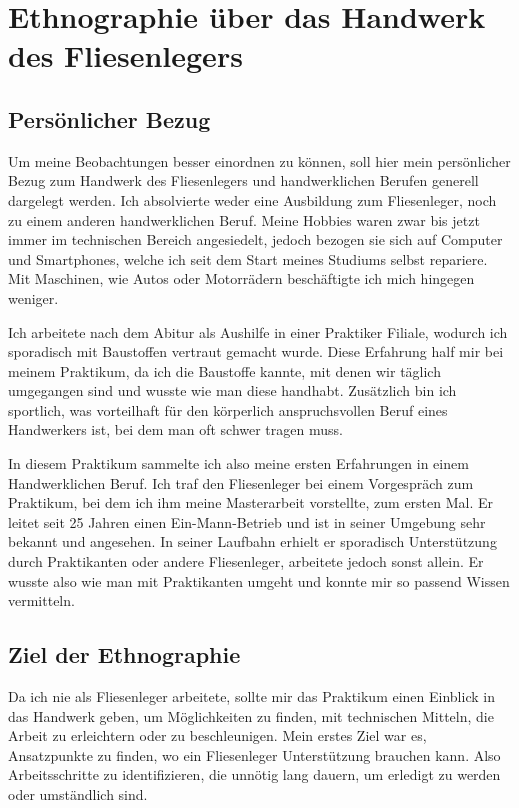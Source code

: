\chapter{Ethnographie über das Handwerk des Fliesenlegers}

\section{Persönlicher Bezug}

Um meine Beobachtungen besser einordnen zu können, soll hier mein persönlicher Bezug zum Handwerk des Fliesenlegers und handwerklichen Berufen generell dargelegt werden. Ich absolvierte weder eine Ausbildung zum Fliesenleger, noch zu einem anderen handwerklichen Beruf. Meine Hobbies waren zwar bis jetzt immer im technischen Bereich angesiedelt, jedoch bezogen sie sich auf Computer und Smartphones, welche ich seit dem Start meines Studiums selbst repariere. Mit Maschinen, wie Autos oder Motorrädern beschäftigte ich mich hingegen weniger. 

Ich arbeitete nach dem Abitur als Aushilfe in einer Praktiker Filiale, wodurch ich sporadisch mit Baustoffen vertraut gemacht wurde. Diese Erfahrung half mir bei meinem Praktikum, da ich die Baustoffe kannte, mit denen wir täglich umgegangen sind und wusste wie man diese handhabt. Zusätzlich bin ich sportlich, was vorteilhaft für den körperlich anspruchsvollen Beruf eines Handwerkers ist, bei dem man oft schwer tragen muss.

In diesem Praktikum sammelte ich also meine ersten Erfahrungen in einem Handwerklichen Beruf. Ich traf den Fliesenleger bei einem Vorgespräch zum Praktikum, bei dem ich ihm meine Masterarbeit vorstellte, zum ersten Mal. Er leitet seit 25 Jahren einen Ein-Mann-Betrieb und ist in seiner Umgebung sehr bekannt und angesehen. In seiner Laufbahn erhielt er sporadisch Unterstützung durch Praktikanten oder andere Fliesenleger, arbeitete jedoch sonst allein. Er wusste also wie man mit Praktikanten umgeht und konnte mir so passend Wissen vermitteln.

\section{Ziel der Ethnographie}

Da ich nie als Fliesenleger arbeitete, sollte mir das Praktikum einen Einblick in das Handwerk geben, um Möglichkeiten zu finden, mit technischen Mitteln, die Arbeit zu erleichtern oder zu beschleunigen. Mein erstes Ziel war es, Ansatzpunkte zu finden, wo ein Fliesenleger Unterstützung brauchen kann. Also Arbeitsschritte zu identifizieren, die unnötig lang dauern, um erledigt zu werden oder umständlich sind.

